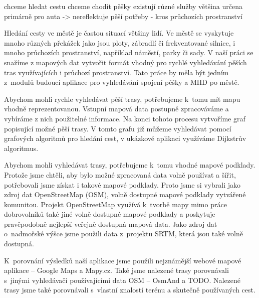 
chceme hledat cestu
chceme chodit pěšky
existují různé služby
většina určena primárně pro auta -> nereflektuje pěší potřeby
 - kros průchozích prostranství


Hledání cesty ve městě je častou situací většiny lidí. Ve městě se vyskytuje
mnoho různých překážek jako jsou ploty, zábradlí či frekventované silnice,
i mnoho průchozích prostranství, například náměstí, parky či sady. V naší práci
se snažíme z mapových dat vytvořit formát vhodný pro rychlé vyhledávání pěších
tras využívajících i průchozí prostranství. Tato práce by měla být jedním z~modulů
budoucí aplikace pro vyhledávání spojení pěšky a MHD po městě. 

Abychom mohli rychle vyhledávat pěší trasy, potřebujeme k~tomu mít mapu vhodně
reprezentovanou. Vstupní mapová data postupně zpracováváme a vybíráme z nich
použitelné informace. Na konci tohoto procesu vytvoříme graf popisující možné
pěší trasy. V tomto grafu již můžeme vyhledávat pomocí grafových algoritmů pro
hledání cest, v ukázkové aplikaci využíváme Dijkstrův algoritmus. 

Abychom mohli vyhledávat trasy, potřebujeme k~tomu vhodné mapové podklady.
Protože jsme chtěli, aby bylo možné zpracovaná data volně používat a šířit, 
potřebovali jsme získat i takové mapové podklady. Proto jsme si vybrali jako
zdroj dat OpenStreetMap (OSM), volně dostupné mapové podklady vytvářené komunitou. 
Projekt OpenStreetMap využívá k~tvorbě mapy mimo práce dobrovolníků také jiné
volně dostupné mapové podklady a poskytuje pravěpodobně nejlepší veřejně
dostupná mapová data. Jako zdroj dat o~nadmořské výšce jsme použili data
z~projektu SRTM, která jsou také volně dostupná.

K~porovnání výsledků naší aplikace jsme použili nejznámější webové mapové
aplikace -- Google Maps a Mapy.cz. Také jsme nalezené trasy porovnávali s~jinými
vyhledávači používajícími data OSM -- OsmAnd a TODO. Nalezené trasy jsme také
porovnávali s~vlastní znalostí terénu a skutečně používaných cest.

